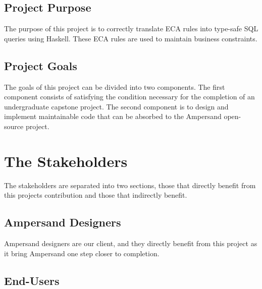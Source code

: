 \documentclass[12pt]{report}
\begin{document}
\subsection{Project Purpose}
The purpose of this project is to correctly translate ECA rules
 into type-safe SQL queries using Haskell. These ECA rules are used to 
maintain business constraints.
\subsection{Project Goals} 
The goals of this project can be divided into two components. The first 
component consists of satisfying the condition necessary for the completion of 
an undergraduate capstone project. 
The second component is to design and 
implement maintainable code that can be absorbed to the Ampersand open-source 
project. 

\section{The Stakeholders}\label{sec:Stakeholders}
The stakeholders are separated into two sections, those that directly benefit 
from this projects contribution and those that indirectly benefit.
\subsection{Ampersand Designers}\label{subsec:Ampersand}
Ampersand designers are our client, and they directly benefit from this project 
as it bring Ampersand one step closer to completion. 


\subsection{End-Users}\label{subsec:BusReq}
\end{document}
